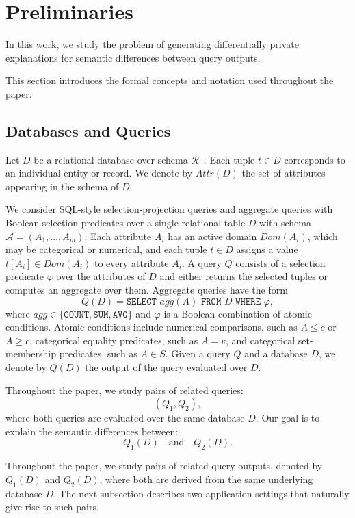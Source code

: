 \section{Preliminaries}
\label{sec:preliminaries}

In this work, we study the problem of generating differentially private explanations
for semantic differences between query outputs.

This section introduces the formal concepts and notation used throughout the paper.

\subsection{Databases and Queries}
\label{subsec:prelim-db-queries}

Let $D$ be a relational database over schema $\mathcal{R}$~\cite{Foundations}.
Each tuple $t \in D$ corresponds to an individual entity or record.
We denote by $Attr(D)$ the set of attributes appearing in the schema of $D$.

We consider SQL-style selection-projection queries and aggregate queries
with Boolean selection predicates over a single relational table
$D$ with schema $\mathcal{A}=(A_1,\ldots,A_m)$. Each attribute $A_i$
has an active domain $Dom(A_i)$, which may be categorical or numerical,
and each tuple $t \in D$ assigns a value $t[A_i] \in Dom(A_i)$ to every
attribute $A_i$. A query $Q$ consists of a selection predicate $\varphi$
over the attributes of $D$ and either returns the selected tuples or
computes an aggregate over them. Aggregate queries have the form
\[
Q(D) =
\texttt{SELECT } agg(A)
\texttt{ FROM } D
\texttt{ WHERE } \varphi,
\]
where $agg \in \{\texttt{COUNT},\texttt{SUM},\texttt{AVG}\}$ and
$\varphi$ is a Boolean combination of atomic conditions. Atomic
conditions include numerical comparisons, such as $A \leq c$ or
$A \geq c$, categorical equality predicates, such as $A = v$, and
categorical set-membership predicates, such as $A \in S$. Given a query
$Q$ and a database $D$, we denote by $Q(D)$ the output of the query
evaluated over $D$.



Throughout the paper, we study pairs of related queries:
\[
(Q_1,Q_2),
\]
where both queries are evaluated over the same database $D$.
Our goal is to explain the semantic differences between:
\[
Q_1(D)
\quad\text{and}\quad
Q_2(D).
\]

Throughout the paper, we study pairs of related query outputs, denoted
by $Q_1(D)$ and $Q_2(D)$, where both are derived from the same underlying
database $D$. The next subsection describes two application settings that
naturally give rise to such pairs.

